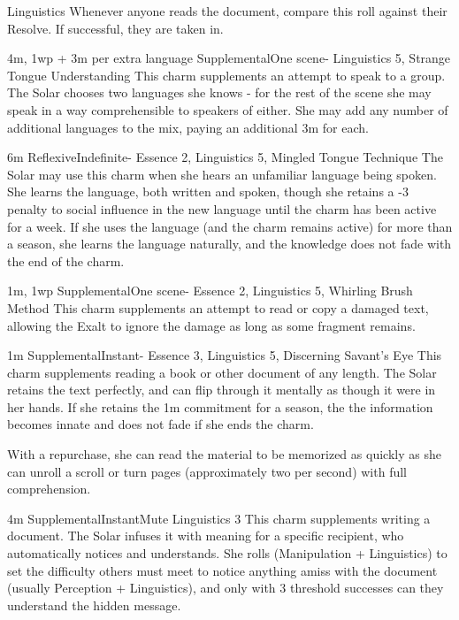 \begin{Ability}{Linguistics}
  Whenever anyone reads the document, compare this roll against their Resolve. If successful, they are taken in.

  {4m, 1wp + 3m per extra language}
  {Supplemental}{One scene}{-}
  {Linguistics 5, Strange Tongue Understanding}
  This charm supplements an attempt to speak to a group. The Solar chooses two languages she knows - for the rest of the scene she may speak in a way comprehensible to speakers of either. She may add any number of additional languages to the mix, paying an additional 3m for each.

  {6m}
  {Reflexive}{Indefinite}{-}
  {Essence 2, Linguistics 5, Mingled Tongue Technique}
  The Solar may use this charm when she hears an unfamiliar language being spoken. She learns the language, both written and spoken, though she retains a -3 penalty to social influence in the new language until the charm has been active for a week. If she uses the language (and the charm remains active) for more than a season, she learns the language naturally, and the knowledge does not fade with the end of the charm.

  {1m, 1wp}
  {Supplemental}{One scene}{-}
  {Essence 2, Linguistics 5, Whirling Brush Method}
  This charm supplements an attempt to read or copy a damaged text, allowing the Exalt to ignore the damage as long as some fragment remains.

  {1m}
  {Supplemental}{Instant}{-}
  {Essence 3, Linguistics 5, Discerning Savant's Eye}
  This charm supplements reading a book or other document of any length. The Solar retains the text perfectly, and can flip through it mentally as though it were in her hands. If she retains the 1m commitment for a season, the the information becomes innate and does not fade if she ends the charm.

  With a repurchase, she can read the material to be memorized as quickly as she can unroll a scroll or turn pages (approximately two per second) with full comprehension.

  {4m}
  {Supplemental}{Instant}{Mute}
  {Linguistics 3}
  This charm supplements writing a document. The Solar infuses it with meaning for a specific recipient, who automatically notices and understands. She rolls (Manipulation + Linguistics) to set the difficulty others must meet to notice anything amiss with the document (usually Perception + Linguistics), and only with 3 threshold successes can they understand the hidden message.


\end{Ability}
